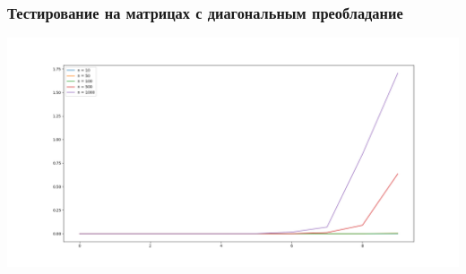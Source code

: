 \documentclass[english]{article}
\begin{document}
\subsubsection{Тестирование на матрицах с диагональным преобладание}
\begin{center}
    \includegraphics[scale=0.4]{direct.png}
\end{center}
\end{document}
